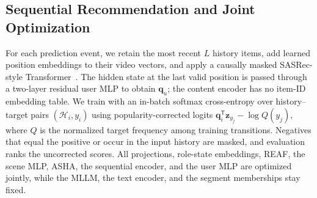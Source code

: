 \subsection{Sequential Recommendation and Joint Optimization}
\label{sec:objective}
For each prediction event, we retain the most recent $L$ history items, add learned position embeddings to their video vectors, and apply a causally masked SASRec-style Transformer~\cite{kang2018sasrec}.
The hidden state at the last valid position is passed through a two-layer residual user MLP to obtain $\mathbf{q}_u$; the content encoder has no item-ID embedding table.
We train with an in-batch softmax cross-entropy over history--target pairs $(\mathcal{H}_i,y_i)$ using popularity-corrected logits $\mathbf{q}_i^{\mathsf T}\mathbf{z}_{y_j}-\log Q(y_j)$, where $Q$ is the normalized target frequency among training transitions.
Negatives that equal the positive or occur in the input history are masked, and evaluation ranks the uncorrected scores.
All projections, role-state embeddings, REAF, the scene MLP, ASHA, the sequential encoder, and the user MLP are optimized jointly, while the MLLM, the text encoder, and the segment memberships stay fixed.

